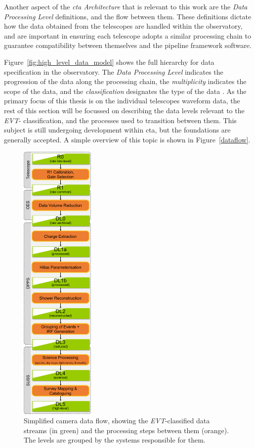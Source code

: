 Another aspect of the \textit{\gls{cta} Architecture} that is relevant to this work are the \textit{Data Processing Level} definitions, and the flow between them. These definitions dictate how the data obtained from the telescopes are handled within the observatory, and are important in ensuring each telescope adopts a similar processing chain to guarantee compatibility between themselves and the pipeline framework software.

Figure~\ref{fig:high_level_data_model} shows the full hierarchy for data specification in the observatory. The \textit{Data Processing Level} indicates the progression of the data along the processing chain, the \textit{multiplicity} indicates the scope of the data, and the \textit{classification} designates the type of the data \cite{Kosack2017}. As the primary focus of this thesis is on the individual telescopes waveform data, the rest of this section will be focussed on describing the data levels relevant to the \textit{EVT}- classification, and the processes used to transition between them. This subject is still undergoing development within \gls{cta}, but the foundations are generally accepted. A simple overview of this topic is shown in Figure~\ref{dataflow}.

\begin{figure}
  \includegraphics[width=0.32\textwidth]{figures/images/dataflow}
  \caption{Simplified camera data flow, showing the \textit{EVT}-classified data streams (in green) and
the processing steps between them (orange). The levels are grouped by the systems responsible for them.}\label{fig:dataflow}
\end{figure}

